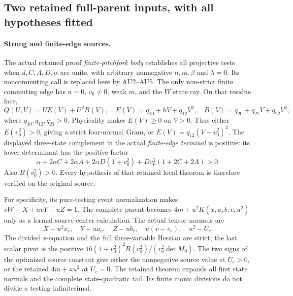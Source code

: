 \subsection{Two retained full-parent inputs, with all hypotheses fitted}

\paragraph{Strong and finite-edge sources.}
The actual retained proof \emph{finite-pitchfork body} establishes
all projective tests when \(d,C,A,D,\alpha\) are units, with
arbitrary nonnegative \(n,m,\beta\) and \(\lambda=0\).
Its noncommuting call is replaced here by AU2--AU5.
The only non-strict finite commuting edge has \(u=0\), \(v_0\ne0\),
weak \(m\), and the \(W\) state ray. On that residue face,
\[
 Q(U,V)=U E(V)+U^2B(V),\quad
 E(V)=q_{10}+hV+q_{12}V^2,\quad
 B(V)=q_{20}+q_{21}V+q_{22}V^2,
 \tag{AU7}
\]
where \(q_{10},q_{12},q_{21}>0\).
Physicality makes \(E(V)\geq0\) on \(V>0\).
Thus either \(E(v_0^2)>0\), giving a strict four-normal Gram,
or \(E(V)=q_{12}(V-v_0^2)^2\).
The displayed three-state complement in the actual
\emph{finite-edge terminal} is positive: its lower determinant
has the positive factor
\[
 \alpha+2\alpha C+2\alpha A+2\alpha D(1+v_0^2)
                     +Dv_0^2(1+2C+2A)>0.
\]
Also \(B(v_0^2)>0\). Every hypothesis of that retained local
theorem is therefore verified on the original source.

For specificity, its pure-testing event normalization makes
\(vW-X+uvY-uZ=1\). The complete parent becomes
\(4m+u^2K(x,a,b,v,u^2)\) only as a formal source-center calculation.
The actual tensor normals are
\[
 X-u^2x_c,\quad Y-ua_c,\quad Z-ub_c,\quad
 u(v-v_c),\quad u^2-U_c .
 \tag{AU8}
\]
The divided \(x\)-equation and the full three-variable Hessian
are strict; the last scalar pivot is the positive
\(16(1+v_0^2)^2B(v_0^2)/(v_0^2\det M_0)\).
The two signs of the optimized source constant give either
the nonnegative source value at \(U_c>0\), or the retained
\(4m+\kappa u^2\) at \(U_c=0\).
The retained theorem expands all first state normals and the
complete state-quadratic tail. Its finite monic divisions do
not divide a testing infinitesimal.

